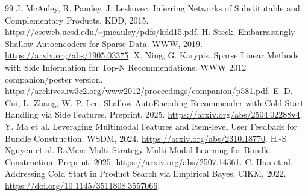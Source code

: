 \documentclass[11pt,a4paper]{article}
\begin{document}
\begin{thebibliography}{99}
 J. McAuley, R. Pandey, J. Leskovec. Inferring Networks of Substitutable
and Complementary Products. KDD, 2015.
\url{https://cseweb.ucsd.edu/~jmcauley/pdfs/kdd15.pdf}.
 H. Steck. Embarrassingly Shallow Autoencoders for Sparse Data. WWW, 2019.
\url{https://arxiv.org/abs/1905.03375}.
 X. Ning, G. Karypis. Sparse Linear Methods with Side Information for
Top-N Recommendations. WWW 2012 companion/poster version.
\url{https://archives.iw3c2.org/www2012/proceedings/companion/p581.pdf}.
 E. D. Cui, L. Zhang, W. P. Lee. Shallow AutoEncoding Recommender with
Cold Start Handling via Side Features. Preprint, 2025.
\url{https://arxiv.org/abs/2504.02288v4}.
 Y. Ma et al. Leveraging Multimodal Features and Item-level User Feedback
for Bundle Construction. WSDM, 2024. \url{https://arxiv.org/abs/2310.18770}.
 H.-S. Nguyen et al. RaMen: Multi-Strategy Multi-Modal Learning for Bundle
Construction. Preprint, 2025. \url{https://arxiv.org/abs/2507.14361}.
 C. Han et al. Addressing Cold Start in Product Search via Empirical Bayes.
CIKM, 2022. \url{https://doi.org/10.1145/3511808.3557066}.
\end{thebibliography}
\end{document}
